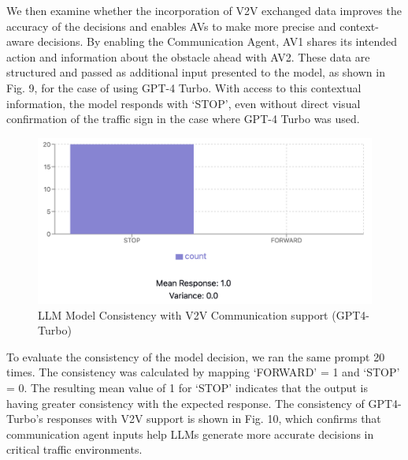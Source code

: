 \documentclass[conference]{IEEEtran}
\begin{document}
We then examine whether the incorporation of V2V exchanged data improves the accuracy of the decisions and enables AVs to make more precise and context-aware decisions. By enabling the Communication Agent, AV1 shares its intended action and information about the obstacle ahead with AV2. These data are structured and passed as additional input presented to the model, as shown in Fig. 9, for the case of using GPT-4 Turbo. With access to this contextual information, the model responds with `STOP', even without direct visual confirmation of the traffic sign in the case where GPT-4 Turbo was used. 
\begin{figure}[!ht]
     \centering
     \includegraphics[width=\linewidth]{Fig/mean_wtihCA.png}
     \caption{LLM Model Consistency with V2V Communication support (GPT4-Turbo) }
     \label{fig:enter-label}
\end{figure}

To evaluate the consistency of the model decision, we ran the same prompt 20 times. The consistency was calculated by mapping `FORWARD' = 1 and `STOP' = 0. The resulting mean value of 1 for `STOP' indicates that the output is having greater consistency with the expected response. The consistency of GPT4-Turbo's responses with V2V support is shown in Fig. 10, which confirms that communication agent inputs help LLMs generate more accurate decisions in critical traffic environments.



\end{document}
